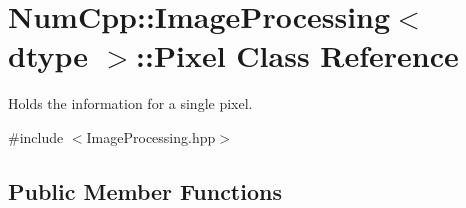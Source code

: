 \hypertarget{class_num_cpp_1_1_image_processing_1_1_pixel}{}\section{Num\+Cpp\+:\+:Image\+Processing$<$ dtype $>$\+:\+:Pixel Class Reference}
\label{class_num_cpp_1_1_image_processing_1_1_pixel}


Holds the information for a single pixel.  




{\ttfamily \#include $<$Image\+Processing.\+hpp$>$}

\subsection*{Public Member Functions}
